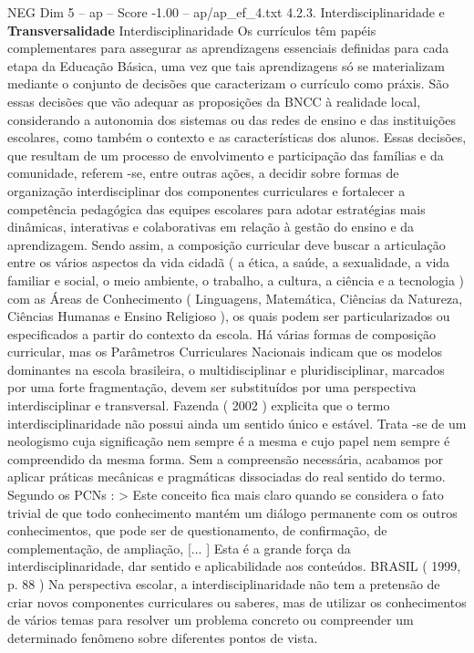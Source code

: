 \begin{textsample}{NEG Dim 5 – ap – Score -1.00 – ap/ap\_ef\_4.txt}  \label{ex:f5_neg_123}
4.2.3.
Interdisciplinaridade e \textbf{Transversalidade} Interdisciplinaridade Os currículos têm papéis complementares para assegurar as aprendizagens essenciais definidas para cada etapa da Educação Básica, uma vez que tais aprendizagens só se materializam mediante o conjunto de decisões que caracterizam o currículo como práxis.
São essas decisões que vão adequar as proposições da BNCC à realidade local, considerando a autonomia dos sistemas ou das redes de ensino e das instituições escolares, como também o contexto e as características dos alunos.
Essas decisões, que resultam de um processo de envolvimento e participação das famílias e da comunidade, referem -se, entre outras ações, a decidir sobre formas de organização interdisciplinar dos componentes curriculares e fortalecer a competência pedagógica das equipes escolares para adotar estratégias mais dinâmicas, interativas e colaborativas em relação à gestão do ensino e da aprendizagem.
Sendo assim, a composição curricular deve buscar a articulação entre os vários aspectos da vida cidadã ( a ética, a saúde, a sexualidade, a vida familiar e social, o meio ambiente, o trabalho, a cultura, a ciência e a tecnologia ) com as Áreas de Conhecimento ( Linguagens, Matemática, Ciências da Natureza, Ciências Humanas e Ensino Religioso ), os quais podem ser particularizados ou especificados a partir do contexto da escola.
Há várias formas de composição curricular, mas os Parâmetros Curriculares Nacionais indicam que os modelos dominantes na escola brasileira, o multidisciplinar e pluridisciplinar, marcados por uma forte fragmentação, devem ser substituídos por uma perspectiva interdisciplinar e transversal.
Fazenda ( 2002 ) explicita que o termo interdisciplinaridade não possui ainda um sentido único e estável.
Trata -se de um neologismo cuja significação nem sempre é a mesma e cujo papel nem sempre é compreendido da mesma forma.
Sem a compreensão necessária, acabamos por aplicar práticas mecânicas e pragmáticas dissociadas do real sentido do termo.
Segundo os PCNs : > Este conceito fica mais claro quando se considera o fato trivial de que todo conhecimento mantém um diálogo permanente com os outros conhecimentos, que pode ser de questionamento, de confirmação, de complementação, de ampliação, [... ] Esta é a grande força da interdisciplinaridade, dar sentido e aplicabilidade aos conteúdos.
BRASIL ( 1999, p. 88 ) Na perspectiva escolar, a interdisciplinaridade não tem a pretensão de criar novos componentes curriculares ou saberes, mas de utilizar os conhecimentos de vários temas para resolver um problema concreto ou compreender um determinado fenômeno sobre diferentes pontos de vista.

\end{textsample}
